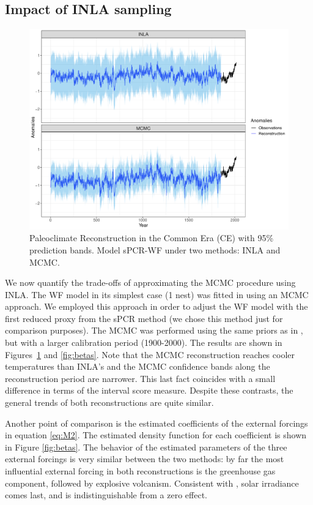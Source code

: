 \documentclass[12pt]{amsart}
\theoremstyle{plain}
\theoremstyle{definition}
\theoremstyle{remark}
\begin{document}
\subsection{Impact of INLA sampling}

\begin{figure}
  \centering
  \includegraphics[scale=0.40]{RecCE_MCMC}
  \caption{Paleoclimate Reconstruction in the Common Era (CE) with 95\%
    prediction bands. Model sPCR-WF under two methods: INLA and MCMC.}
  \label{fig:paleoCE4}
\end{figure}

We now quantify the trade-offs of approximating the MCMC procedure using INLA. The WF model in its simplest case (1 nest) was fitted in \cite{Barboza2014}
using an MCMC approach. We employed this approach in order to adjust the
WF model with the first reduced proxy from the sPCR method (we chose this method
just for comparison purposes). The MCMC was performed using the
same priors as in \cite{Barboza2014}, but with a larger calibration period
(1900-2000). The results are shown in Figures~\ref{fig:paleoCE4} and
\ref{fig:betas}. Note that the MCMC reconstruction reaches cooler temperatures
than INLA's and the MCMC confidence bands along the reconstruction period are
narrower. This last fact coincides with a small difference in terms of the
interval score measure. Despite these contrasts, the general trends of both reconstructions are quite similar. 

Another point of comparison is the estimated coefficients of the
external forcings in equation \eqref{eq:M2}. The estimated density function
for each coefficient is shown in Figure \ref{fig:betas}. The behavior of the
estimated parameters of the three external forcings is very similar between the
two methods: by far the most influential external forcing in
both reconstructions is the greenhouse gas component, followed by explosive volcanism. Consistent with \citet{Schurer2013b}, solar irradiance comes last, and is indistinguishable from a zero effect. 
\end{document}
